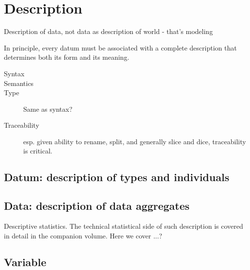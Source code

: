 \documentclass[reqno,12pt]{tufte-book}
\numberwithin{equation}{subsection}
\begin{document}
\part{Description}

\begin{ednote}
  Description of data, not data as description of world - that's modeling
\end{ednote}

In principle, every datum must be associated with a complete
description that determines both its form and its meaning.

\begin{description}
\item [Syntax]
\item [Semantics]
\item [Type]  Same as syntax?
\item [Traceability] esp. given ability to rename, split, and
  generally slice and dice, traceability is critical.
\end{description}

\chapter{Datum: description of types and individuals}

\chapter{Data: description of data aggregates}

Descriptive statistics.  The technical statistical side of such
description is covered in detail in the companion volume.  Here we
cover ...?

\chapter{Variable}
\end{document}
